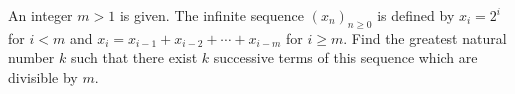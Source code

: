 An integer $ m > 1$ is given. The inﬁnite sequence $ (x_n)_{n\ge 0}$ is deﬁned by $ x_i=2^i$ for $ i<m$ and $ x_i=x_{i-1}+x_{i-2}+\cdots +x_{i-m}$ for $ i\ge m$.
Find the greatest natural number $ k$ such that there exist $ k$ successive terms of this sequence which are divisible by $ m$.
